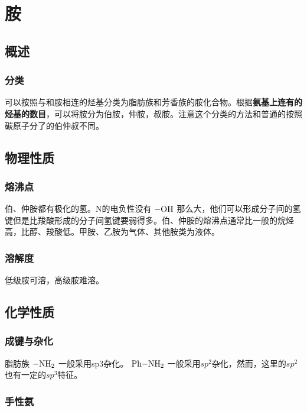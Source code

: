 
\section{胺}

\subsection{概述}

\subsubsection{分类}


可以按照与和胺相连的烃基分类为脂肪族和芳香族的胺化合物。根据\textbf{氨基上连有的烃基的数目}，可以将胺分为伯胺，仲胺，叔胺。注意这个分类的方法和普通的按照碳原子分了的伯仲叔不同。


\subsection{物理性质}

\subsubsection{熔沸点}
伯、仲胺都有极化的氢。N的电负性没有 $\ce{-OH}$ 那么大，他们可以形成分子间的氢键但是比羧酸形成的分子间氢键要弱得多。伯、仲胺的熔沸点通常比一般的烷烃高，比醇、羧酸低。甲胺、乙胺为气体、其他胺类为液体。

\subsubsection{溶解度}

低级胺可溶，高级胺难溶。


\subsection{化学性质}

\subsubsection*{成键与杂化}

脂肪族 $\ce{-NH2}$ 一般采用sp3杂化。 $\ce{Ph-NH2}$ 一般采用$sp^2$杂化，然而，这里的$sp^2$ 也有一定的$sp^3$特征。


\subsubsection*{手性氨}


